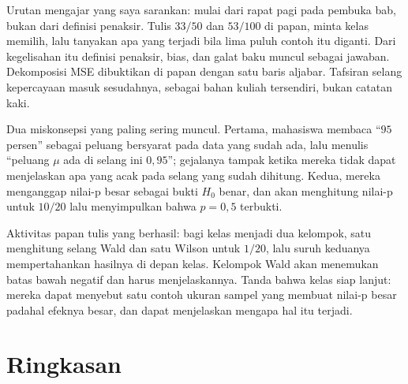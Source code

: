 \begin{untukdosen}
Urutan mengajar yang saya sarankan: mulai dari rapat pagi pada pembuka bab, bukan dari
definisi penaksir. Tulis $33/50$ dan $53/100$ di papan, minta kelas memilih, lalu
tanyakan apa yang terjadi bila lima puluh contoh itu diganti. Dari kegelisahan itu
definisi penaksir, bias, dan galat baku muncul sebagai jawaban. Dekomposisi MSE
dibuktikan di papan dengan satu baris aljabar. Tafsiran selang kepercayaan masuk
sesudahnya, sebagai bahan kuliah tersendiri, bukan catatan kaki.

Dua miskonsepsi yang paling sering muncul. Pertama, mahasiswa membaca ``$95$ persen''
sebagai peluang bersyarat pada data yang sudah ada, lalu menulis ``peluang $\mu$ ada di
selang ini $0{,}95$''; gejalanya tampak ketika mereka tidak dapat menjelaskan apa yang
acak pada selang yang sudah dihitung. Kedua, mereka menganggap nilai-p besar sebagai
bukti $H_0$ benar, dan akan menghitung nilai-p untuk $10/20$ lalu menyimpulkan bahwa
$p=0{,}5$ terbukti.

Aktivitas papan tulis yang berhasil: bagi kelas menjadi dua kelompok, satu menghitung
selang Wald dan satu Wilson untuk $1/20$, lalu suruh keduanya mempertahankan hasilnya
di depan kelas. Kelompok Wald akan menemukan batas bawah negatif dan harus
menjelaskannya. Tanda bahwa kelas siap lanjut: mereka dapat menyebut satu contoh
ukuran sampel yang membuat nilai-p besar padahal efeknya besar, dan dapat menjelaskan
mengapa hal itu terjadi.
\end{untukdosen}

\section{Ringkasan}

